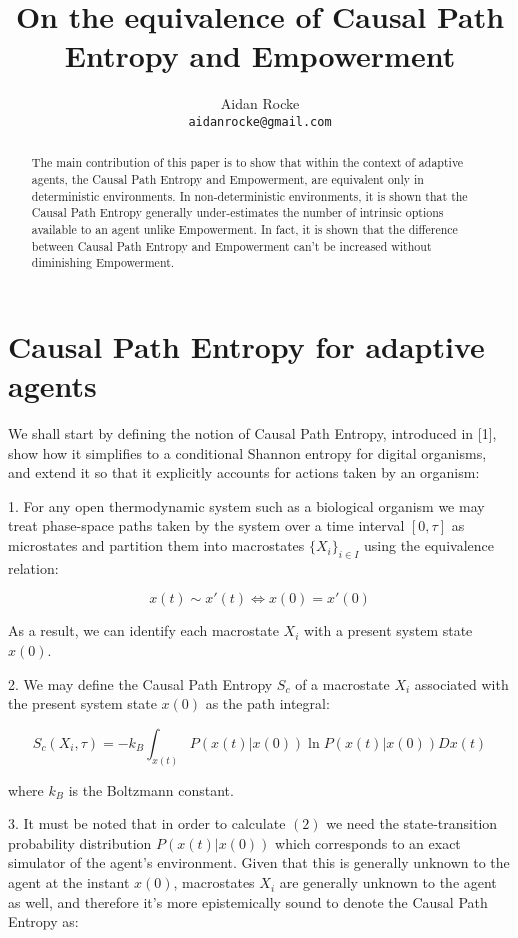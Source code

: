 \documentclass{article}
\title{On the equivalence of Causal Path Entropy and Empowerment}
\author{%
  Aidan Rocke\\
  \texttt{aidanrocke@gmail.com} \\
}
\begin{document}

\maketitle

\begin{abstract}
   The main contribution of this paper is to show that within the context of adaptive agents, the Causal Path Entropy and Empowerment, are equivalent only in deterministic environments. In non-deterministic environments, it is shown that the Causal Path Entropy generally under-estimates the number of intrinsic options available to an agent unlike Empowerment. In fact, it is shown that the difference between Causal Path Entropy and Empowerment can't be increased without diminishing Empowerment. 
\end{abstract}

\section{Causal Path Entropy for adaptive agents}

We shall start by defining the notion of Causal Path Entropy, introduced in [1], show how it simplifies to a conditional Shannon entropy for digital organisms, and extend it so that it explicitly accounts for actions taken by an organism: 

1. For any open thermodynamic system such as a biological organism we may treat phase-space paths taken by the system over a time interval $[0,\tau]$ as microstates and partition them into macrostates $\{X_i\}_{i\in I}$ using the equivalence relation:

\begin{equation}
x(t) \sim x'(t) \iff x(0)=x'(0)	
\end{equation}

As a result, we can identify each macrostate $X_i$ with a present system state $x(0)$.

2. We may define the Causal Path Entropy $S_c$ of a macrostate $X_i$ associated with the present system state $x(0)$ as the path integral:

\begin{equation}
S_c(X_i,\tau)=-k_B \int_{x(t)} P(x(t)|x(0))\ln P(x(t)|x(0)) Dx(t)
\end{equation}

where $k_B$ is the Boltzmann constant. 

3. It must be noted that in order to calculate $(2)$ we need the state-transition probability distribution $P(x(t)|x(0))$ which corresponds to an exact simulator of the agent's environment. Given that this is generally unknown to the agent at the instant $x(0)$, macrostates $X_i$ are generally unknown to the agent as well, and therefore it's more epistemically sound to denote the Causal Path Entropy as:
\end{document}
